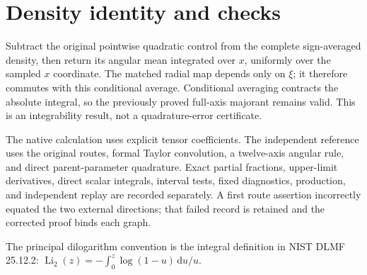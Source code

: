 \documentclass[11pt]{article}
\newcommand{\dd}{\,\mathrm d}
\begin{document}
\section*{Density identity and checks}
Subtract the original pointwise quadratic control from the complete
sign-averaged density, then return its angular mean integrated over \(x\),
uniformly over the sampled \(x\) coordinate. The matched radial map depends
only on \(\xi\); it therefore commutes with this conditional average.
Conditional averaging contracts the absolute integral, so the previously
proved full-axis majorant remains valid. This is an integrability result,
not a quadrature-error certificate.

The native calculation uses explicit tensor coefficients. The independent
reference uses the original routes, formal Taylor convolution, a twelve-axis
angular rule, and direct parent-parameter quadrature. Exact partial fractions,
upper-limit derivatives, direct scalar integrals, interval tests, fixed
diagnostics, production, and independent replay are recorded separately.
A first route assertion incorrectly equated the two external directions;
that failed record is retained and the corrected proof binds each graph.

\noindent The principal dilogarithm convention is the integral definition in
NIST DLMF 25.12.2:
\(\operatorname{Li}_2(z)=-\int_0^z \log(1-u)\dd u/u\).
\end{document}
